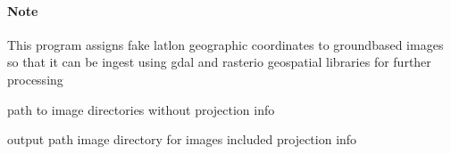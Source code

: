 \documentclass[letterpaper,10pt,english]{sphinxmanual}
\begin{document}

\begin{fulllineitems}
\label{\detokenize{akhdefo_functions:akhdefo_functions.Akhdefo_Tools.assign_fake_projection}}
\pysigstartsignatures
{}
\pysigstopsignatures

\paragraph{Note}
\label{\detokenize{akhdefo_functions:note}}
\sphinxAtStartPar
This program assigns fake latlon geographic coordinates to ground\sphinxhyphen{}based images 
so that it can be ingest using gdal and rasterio geospatial libraries for further processing
\begin{description}
\sphinxAtStartPar
path to image directories without projection info

\sphinxAtStartPar
output path image directory for images included projection info

\end{description}

\end{fulllineitems}

\end{document}
